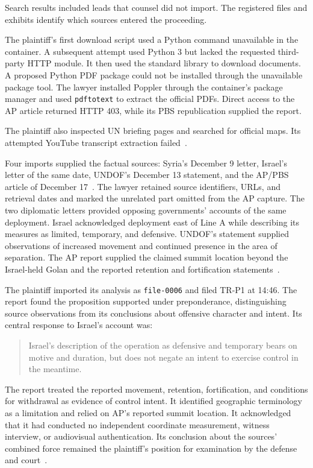\documentclass[11pt]{article}
\newcommand{\code}[1]{\texttt{#1}}
\begin{document}
Search results included leads that counsel did not import.  The registered files and exhibits identify which sources entered the proceeding.

The plaintiff's first download script used a Python command unavailable in the container.  A subsequent attempt used Python 3 but lacked the requested third-party HTTP module.  It then used the standard library to download documents.  A proposed Python PDF package could not be installed through the unavailable package tool.  The lawyer installed Poppler through the container's package manager and used \code{pdftotext} to extract the official PDFs.  Direct access to the AP article returned HTTP 403, while its PBS republication supplied the report.

The plaintiff also inspected UN briefing pages and searched for official maps.  Its attempted YouTube transcript extraction failed~\cite[plaintiff tool log and work notes at 14:34:59 and 14:41:52]{record}.

Four imports supplied the factual sources: Syria's December 9 letter, Israel's letter of the same date, UNDOF's December 13 statement, and the AP/PBS article of December 17~\cite{syrialetter,israelletter,undofstatement,apreport}.  The lawyer retained source identifiers, URLs, and retrieval dates and marked the unrelated part omitted from the AP capture.  The two diplomatic letters provided opposing governments' accounts of the same deployment.  Israel acknowledged deployment east of Line A while describing its measures as limited, temporary, and defensive.  UNDOF's statement supplied observations of increased movement and continued presence in the area of separation.  The AP report supplied the claimed summit location beyond the Israel-held Golan and the reported retention and fortification statements~\cite[events 9--12, files 0002--0005]{record}.

The plaintiff imported its analysis as \code{file-0006} and filed TR-P1 at 14:46.  The report found the proposition supported under preponderance, distinguishing source observations from its conclusions about offensive character and intent.  Its central response to Israel's account was:
\begin{quote}
Israel's description of the operation as defensive and temporary bears on motive and duration, but does not negate an intent to exercise control in the meantime.
\end{quote}
The report treated the reported movement, retention, fortification, and conditions for withdrawal as evidence of control intent.  It identified geographic terminology as a limitation and relied on AP's reported summit location.  It acknowledged that it had conducted no independent coordinate measurement, witness interview, or audiovisual authentication.  Its conclusion about the sources' combined force remained the plaintiff's position for examination by the defense and court~\cite[events 13--15 and file 0006]{record}.
\end{document}
